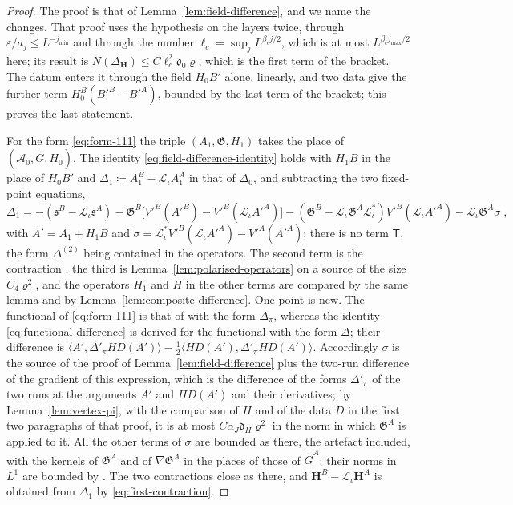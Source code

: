 \begin{proof}
The proof is that of Lemma~\ref{lem:field-difference}, and we name the changes. That proof uses the hypothesis on the layers twice, through $\varepsilon/a_j \leq L^{-j_{\min}}$ and through the number $\ell_c = \sup_jL^{\beta_cj/2}$, which is at most $L^{\beta_cj_{\max}/2}$ here; its result is $N(\Delta_{\mathbf H}) \leq C\ell_c^2\mathfrak d_0\varrho$, which is the first term of the bracket. The datum enters it through the field $H_0B'$ alone, linearly, and two data give the further term $H^B_0(B'^B - B'^A)$, bounded by the last term of the bracket; this proves the last statement.

For the form \eqref{eq:form-111} the triple $(A_1, \mathfrak G, H_1)$ takes the place of $(\mathscr A_0, \tilde G, H_0)$. The identity \eqref{eq:field-difference-identity} holds with $H_1B$ in the place of $H_0B'$ and $\Delta_1 \coloneqq A^B_1 - \mathcal L_\iota A^A_1$ in that of $\Delta_0$, and subtracting the two fixed-point equations,
\[
    \Delta_1 = -(\mathfrak s^B - \mathcal L_\iota\mathfrak s^A) - \mathfrak G^B\bigl[V'^B(A'^B) - V'^B(\mathcal L_\iota A'^A)\bigr] - (\mathfrak G^B - \mathcal L_\iota\mathfrak G^A\mathcal L_\iota^*)V'^B(\mathcal L_\iota A'^A) - \mathcal L_\iota\mathfrak G^A\sigma\;,
\]
with $A' = A_1 + H_1B$ and $\sigma = \mathcal L_\iota^*V'^B(\mathcal L_\iota A'^A) - V'^A(A'^A)$; there is no term $\mathsf T$, the form $\Delta^{(2)}$ being contained in the operators. The second term is the contraction \cite[(119)--(121)]{BalabanVAR}, the third is Lemma~\ref{lem:polarised-operators} on a source of the size $C_4\varrho^2$, and the operators $H_1$ and $H$ in the other terms are compared by the same lemma and by Lemma~\ref{lem:composite-difference}. One point is new. The functional of \eqref{eq:form-111} is that of \cite[(80)]{BalabanVAR} with the form $\Delta_\pi$, whereas the identity \eqref{eq:functional-difference} is derived for the functional with the form $\Delta$; their difference is $\langle A', \Delta'_\pi HD(A')\rangle - \frac{1}{2}\langle HD(A'), \Delta'_\pi HD(A')\rangle$. Accordingly $\sigma$ is the source of the proof of Lemma~\ref{lem:field-difference} plus the two-run difference of the gradient of this expression, which is the difference of the forms $\Delta'_\pi$ of the two runs at the arguments $A'$ and $HD(A')$ and their derivatives; by Lemma~\ref{lem:vertex-pi}, with the comparison of $H$ and of the data $D$ in the first two paragraphs of that proof, it is at most $C\alpha_J\mathfrak d_H\varrho^2$ in the norm in which $\mathfrak G^A$ is applied to it. All the other terms of $\sigma$ are bounded as there, the artefact included, with the kernels of $\mathfrak G^A$ and of $\nabla\mathfrak G^A$ in the places of those of $\tilde G^A$; their norms in $L^1$ are bounded by \cite[Theorem~3.13]{BalabanPBG}. The two contractions close as there, and $\mathbf H^B - \mathcal L_\iota\mathbf H^A$ is obtained from $\Delta_1$ by \eqref{eq:first-contraction}.
\end{proof}

